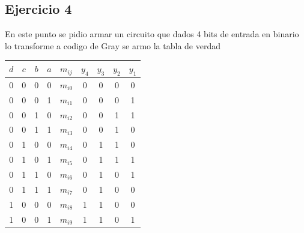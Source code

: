 \documentclass[a4paper]{article}
\begin{document}
\subsection*{Ejercicio 4}
En este punto se pidio armar un circuito que dados 4 bits de entrada en binario lo transforme a codigo de Gray  se armo la tabla de verdad 
\begin{table}[H]
\centering
\begin{tabular}{|c|c|c|c|c|c|c|c|c|}
\hline
\textbf{$d$} & \textbf{$c$} & \textbf{$b$} & \textbf{$a$} & \textbf{$m_{ij}$} & \textbf{$y_4$} & \textbf{$y_3$} & \textbf{$y_2$} & \textbf{$y_1$} \\ \hline
0              & 0              & 0              & 0              & \textbf{$m_{i0}$}   & 0              & 0              & 0              & 0              \\ \hline
0              & 0              & 0              & 1              & \textbf{$m_{i1}$}   & 0              & 0              & 0              & 1              \\ \hline
0              & 0              & 1              & 0              & \textbf{$m_{i2}$}   & 0              & 0              & 1              & 1              \\ \hline
0              & 0              & 1              & 1              & \textbf{$m_{i3}$}   & 0              & 0              & 1              & 0              \\ \hline
0              & 1              & 0              & 0              & \textbf{$m_{i4}$}   & 0              & 1              & 1              & 0              \\ \hline
0              & 1              & 0              & 1              & \textbf{$m_{i5}$}   & 0              & 1              & 1              & 1              \\ \hline
0              & 1              & 1              & 0              & \textbf{$m_{i6}$}   & 0              & 1              & 0              & 1              \\ \hline
0              & 1              & 1              & 1              & \textbf{$m_{i7}$}   & 0              & 1              & 0              & 0              \\ \hline
1              & 0              & 0              & 0              & \textbf{$m_{i8}$}   & 1              & 1              & 0              & 0              \\ \hline
1              & 0              & 0              & 1              & \textbf{$m_{i9}$}   & 1              & 1              & 0              & 1              \\ \hline

\end{tabular}
\end{table}
\end{document}
